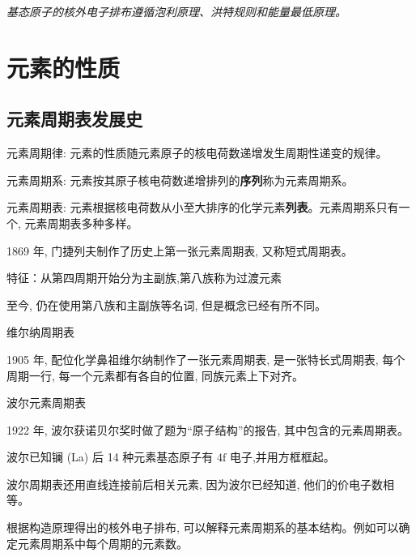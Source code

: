 \documentclass[10pt,cn]{elegantbook}
\begin{document}
	 \textit{基态原子的核外电子排布遵循泡利原理、洪特规则和能量最低原理。}
	 
	 
 \chapter{元素的性质}
	 
	 \section{元素周期表发展史}
	 
	 元素周期律: 元素的性质随元素原子的核电荷数递增发生周期性递变的规律。
	 
	 元素周期系: 元素按其原子核电荷数递增排列的\textbf{序列}称为元素周期系。
	 
	 元素周期表: 元素根据核电荷数从小至大排序的化学元素\textbf{列表}。元素周期系只有一个, 元素周期表多种多样。
	 
	 1869 年, 门捷列夫制作了历史上第一张元素周期表, 又称短式周期表。
	 
	 特征：从第四周期开始分为主副族,第八族称为过渡元素
	 
	 至今, 仍在使用第八族和主副族等名词, 但是概念已经有所不同。
	 
	 维尔纳周期表
	 
	 1905 年, 配位化学鼻祖维尔纳制作了一张元素周期表, 是一张特长式周期表, 每个周期一行, 每一个元素都有各自的位置, 同族元素上下对齐。
	 
	  波尔元素周期表
	 
	 1922 年, 波尔获诺贝尔奖时做了题为“原子结构”的报告, 其中包含的元素周期表。
	 
	 波尔已知镧 (La) 后 14 种元素基态原子有 \(4\mathrm{f}\) 电子,并用方框框起。
	 
	 波尔周期表还用直线连接前后相关元素, 因为波尔已经知道, 他们的价电子数相等。
	 
	 根据构造原理得出的核外电子排布, 可以解释元素周期系的基本结构。例如可以确定元素周期系中每个周期的元素数。
	 
\end{document}
